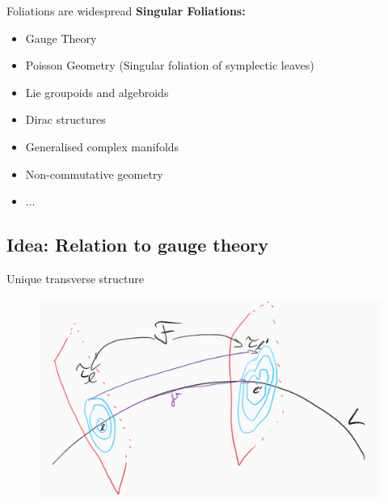 \documentclass[
aspectratio=3218, 
10pt, hyperref={pdfpagelabels=false}]{beamer}
\theoremstyle{plain}
\theoremstyle{remark}
\begin{document}
{
\begin{frame}{Foliations are widespread}
\textbf{Singular Foliations:}

\begin{itemize}
	\item Gauge Theory
	\item Poisson Geometry \newline (Singular foliation of symplectic leaves)
	\item Lie groupoids and algebroids
	\item Dirac structures
	\item Generalised complex manifolds
	\item Non-commutative geometry
	\item $\dotsc$
\end{itemize}

\end{frame}
}




\subsection{Idea: Relation to gauge theory}


\begin{frame}{Unique transverse structure}
\begin{figure}[htbp]
	\centering
		\includegraphics[width=.8\textwidth]{Foliation connection.png}
	\label{fig:Foliation connection}
\end{figure}

\end{frame}

\end{document}
